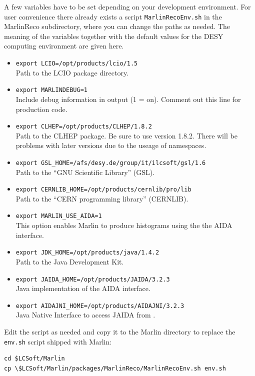 A few variables have to be set depending on your development
environment. For user convenience there already exists a script
{\tt MarlinRecoEnv.sh} in the MarlinReco subdirectory, where you can change 
the paths as needed. The meaning of the variables together with the 
default values for the DESY computing environment are given here.

\begin{itemize}
\item {\tt export LCIO=/opt/products/lcio/1.5} \\
      Path to the LCIO package directory.
\item {\tt export MARLINDEBUG=1} \\
      Include debug information in output (1 = on). 
      Comment out this line for production code. 
\item {\tt export CLHEP=/opt/products/CLHEP/1.8.2} \\ 
      Path to the CLHEP package. Be sure to use version 1.8.2. 
      There will be problems with later versions due to the useage of 
      namespaces.
\item {\tt export GSL\_HOME=/afs/desy.de/group/it/ilcsoft/gsl/1.6} \\
      Path to the ``GNU Scientific Library'' (GSL).
\item {\tt export CERNLIB\_HOME=/opt/products/cernlib/pro/lib} \\
      Path to the ``CERN programming library'' (CERNLIB).
\item {\tt export MARLIN\_USE\_AIDA=1} \\
      This option enables Marlin to produce histograms using the 
      the AIDA~\cite{ref_aida} interface. 
\item {\tt export JDK\_HOME=/opt/products/java/1.4.2} \\
      Path to the Java Development Kit. 
\item {\tt export JAIDA\_HOME=/opt/products/JAIDA/3.2.3} \\
      Java implementation of the AIDA interface.
\item {\tt export AIDAJNI\_HOME=/opt/products/AIDAJNI/3.2.3} \\
      Java Native Interface to access JAIDA from \CPP{}. 
\end{itemize}

Edit the script as needed and copy it to the Marlin directory to
replace the {\tt env.sh} script shipped with Marlin:

\begin{verbatim}
cd $LCSoft/Marlin 
cp \$LCSoft/Marlin/packages/MarlinReco/MarlinRecoEnv.sh env.sh
\end{verbatim}

